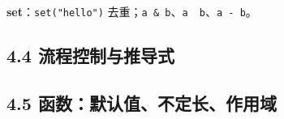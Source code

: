 \textbf{set}：\texttt{set("hello")}
去重；\texttt{a\ \&\ b}、\texttt{a\ \textbar{}\ b}、\texttt{a\ -\ b}。

\subsection{4.4
流程控制与推导式}\label{ux6d41ux7a0bux63a7ux5236ux4e0eux63a8ux5bfcux5f0f}

\begin{Shaded}
\begin{Highlighting}[]
\OperatorTok{=}  \OperatorTok{\textgreater{}=}   

\OperatorTok{=}\NormalTok{ [}\NormalTok{, }\NormalTok{, }\NormalTok{, }\NormalTok{, }\NormalTok{]}
\OperatorTok{=}\NormalTok{ [s }\OperatorTok{\textgreater{}=} \NormalTok{]}

 

\OperatorTok{=}\NormalTok{ [}\NormalTok{, }\NormalTok{]}
 \NormalTok{(names, scores[:}\NormalTok{]):}
\end{Highlighting}
\end{Shaded}

\subsection{4.5
函数：默认值、不定长、作用域}\label{ux51fdux6570ux9ed8ux8ba4ux503cux4e0dux5b9aux957fux4f5cux7528ux57df}

